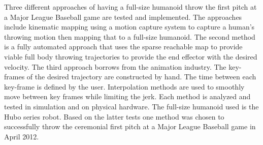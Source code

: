 Three different approaches of having a full-size humanoid throw the first pitch at a Major League Baseball game are tested and implemented.  
The approaches include kinematic mapping using a motion capture system to capture a human's throwing motion then mapping that to a full-size humanoid.  
The second method is a fully automated approach that uses the sparse reachable map to provide viable full body throwing trajectories to provide the end effector with the desired velocity.  
The third approach borrows from the animation industry.  
The key-frames of the desired trajectory are constructed by hand.  
The time between each key-frame is defined by the user.  
Interpolation methods are used to smoothly move between key frames while limiting the jerk.  
Each method is analyzed and tested in simulation and on physical hardware.  
The full-size humanoid used is the Hubo series robot.  
Based on the latter tests one method was chosen to successfully throw the ceremonial first pitch at a Major League Baseball game in April 2012.